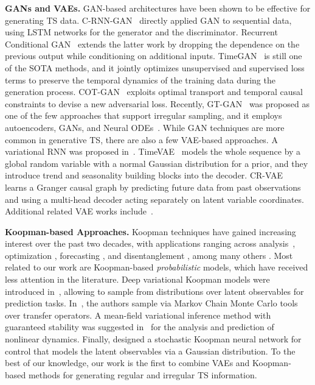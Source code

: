 \documentclass{article} %
\begin{document}
\textbf{GANs and VAEs.} 
GAN-based architectures have been shown to be effective for generating TS data. 
C-RNN-GAN~\citep{mogren2016c} directly applied GAN to sequential data, using LSTM networks for the generator and the discriminator. Recurrent Conditional GAN~\citep{esteban2017real} extends the latter work by dropping the dependence on the previous output while conditioning on additional inputs. 
TimeGAN~\citep{yoon2019time} is still one of the SOTA methods, and it jointly optimizes unsupervised and supervised loss terms to preserve the temporal dynamics of the training data during the generation process. 
COT-GAN~\citep{xu2020cot} exploits optimal transport and temporal causal constraints to devise a new adversarial loss. 
Recently, GT-GAN~\citep{jeon2022gt} was proposed as one of the few approaches that support irregular sampling, and it employs autoencoders, GANs, and Neural ODEs~\citep{chen2018neural}. 
While GAN techniques are more common in generative TS, there are also a few VAE-based approaches. A variational RNN was proposed in~\citep{chung2015recurrent}.
TimeVAE~\citep{desai2021timevae} models the whole sequence by a global random variable with a normal Gaussian distribution for a prior, and they introduce trend and seasonality building blocks into the decoder. 
CR-VAE~\citep{li2023causal} learns a Granger causal graph by predicting future data from past observations and using a multi-head decoder acting separately on latent variable coordinates. Additional related VAE works include~\citep{rubanova2019latent, li2020scalable, zhu2023markovian}.

\textbf{Koopman-based Approaches.} 
Koopman techniques have gained increasing interest over the past two decades, with applications ranging across analysis~\citep{rowley2009spectral, schmid2010dynamic, takeishi2017learning, lusch2018deep, azencot2019consistent}, optimization \citep{dogra2020optimizing, redman2021operator}, forecasting \citep{erichson2019physics, azencot2020forecasting, wang2022koopman, tayal2023koopman}, and disentanglement \citep{berman2023multifactor}, among many others \citep{budivsic2012applied, brunton2021modern}. 
Most related to our work are Koopman-based \emph{probabilistic} models, which have received less attention in the literature. 
Deep variational Koopman models were introduced in~\cite{morton2019deep}, allowing to sample from distributions over latent observables for prediction tasks. 
In~\cite{srinivasan2020mcmc}, the authors sample via Markov Chain Monte Carlo tools over transfer operators. 
A mean-field variational inference method with guaranteed stability was suggested in~\cite{pan2020physics} for the analysis and prediction of nonlinear dynamics. 
Finally, \cite{han2022desko} designed a stochastic Koopman neural network for control that models the latent observables via a Gaussian distribution. 
To the best of our knowledge, our work is the first to combine VAEs and Koopman-based methods for generating regular and irregular TS information.
\end{document}

